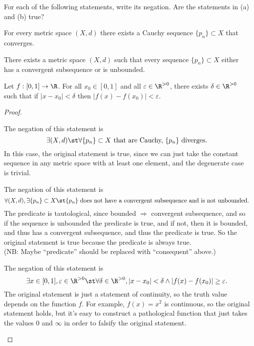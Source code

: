 \documentclass{assignment}
\begin{document}
\begin{question}
  For each of the following statements, write its negation. Are the statements in (a) and (b) true?
\begin{qparts}
  \item For every metric space $(X,d)$ there exists a Cauchy sequence $\{p_n\} \subset X$ that converges.
  \item There exists a metric space $(X, d)$ such that every sequence $\{p_n\} \subset X$ either has a 
convergent subsequence or is unbounded. 
  \item Let $f: [0,1]\to\R$. For all $x_0\in[0,1]$ and all $\varepsilon\in\R^{>0}$, there exists
$\delta\in\R^{>0}$ such that if $|x - x_0| < \delta$ then $|f(x) - f(x_0)| < \varepsilon.$
\end{qparts}
\end{question}
\begin{proof}\leavevmode
\begin{qparts}
  \item The negation of this statement is
$$\exists (X,d) \st \forall \{p_n\} \subset X \text{ that are Cauchy, } \{p_n\} \text{ diverges.}$$
In this case, the original statement is true, since we can just take the constant sequence in any
metric space with at least one element, and the degenerate case is trivial.  

  \item The negation of this statement is 
$$\forall (X, d), \exists \{p_n\} \subset X \st \{p_n\} \text{ does not have a convergent subsequence and
is not unbounded.}$$
The predicate is tautological, since bounded $\Rightarrow$ convergent subsequence, and so if the
sequence is unbounded the predicate is true, and if not, then it is bounded, and thus has a convergent subsequence,
and thus the predicate is true. So the original statement is true because the predicate is always true.\\

(NB: Maybe ``predicate'' should be replaced with ``consequent'' above.)
  
  \item The negation of this statement is $$\exists x\in[0,1], \varepsilon\in\R^{>0} \st \forall \delta
    \in\R^{>0}, |x - x_0| < \delta \wedge |f(x) - f(x_0)| \geq \varepsilon.$$ The original statement 
    is just a statement of continuity, so the truth value depends on the function $f$. For example,
    $f(x) = x^2$ is continuous, so the original statement holds, but it's easy to construct a pathological
    function that just takes the values $0$ and $\infty$ in order to falsify the original statement.
\end{qparts} 
\end{proof}
\end{document}

